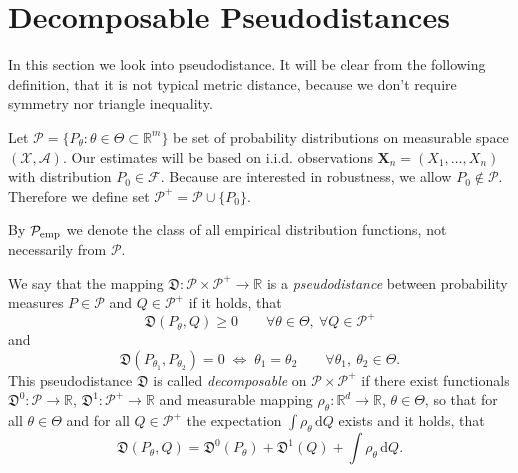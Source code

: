 \section{Decomposable Pseudodistances}

In this section we look into \ren pseudodistance. It will be clear from the following definition, that it is not typical metric distance, because we don't require symmetry nor triangle inequality. 

Let $\mathcal{P} = \lbrace P_\theta : \theta \in \Theta \subset \mathbb{R}^m \rbrace$ be set of probability distributions on measurable space $(\mathcal{X, A})$. Our estimates will be based on i.i.d. observations $\mathbf{X}_n = (X_1, \ldots ,X_n)$ with distribution $P_{0} \in \mathcal{F}$. Because are interested in robustness, we allow $P_{0} \not\in \mathcal{P}$. Therefore we define set $\mathcal{P}^+ = \mathcal{P} \cup \lbrace P_0 \rbrace$.

By $\mathcal{P}_\mathrm{emp}$ we denote the class of all empirical distribution functions, not necessarily from $\mathcal{P}.$
		
		\begin{definition}
	We say that the mapping $\mathfrak{D}:\mathcal{P}\times\mathcal{P}^+ \rightarrow \mathbb{R}$ is a \emph{pseudodistance} between probability measures $P \in \mathcal{P}$ and $Q \in \mathcal{P}^+$ if it holds, that	
		\begin{equation}
			\mathfrak{D}(P_\theta,Q) \geq 0 \qquad \forall \theta \in \Theta, \: \forall Q \in \mathcal{P}^+
		\end{equation}
		and 		
		\begin{equation}
			\mathfrak{D}(P_{\theta_1},P_{\theta_2})=0 \; \Leftrightarrow \; \theta_1=\theta_2 \qquad \forall \theta_1,\: \theta_2 \in \Theta.
		\end{equation}	
	This pseudodistance $\mathfrak{D}$ is called \emph{decomposable} on $\mathcal{P}\times\mathcal{P}^+$ if there exist functionals 
		 $\mathfrak{D}^0:\mathcal{P}\rightarrow\mathbb{R}$, $ \mathfrak{D}^1:\mathcal{P}^+ \rightarrow \mathbb{R}$ and measurable mapping
		  $\rho_\theta : \mathbb{R}^d \rightarrow \mathbb{R}$, $ \theta \in \Theta$, so that for all $\theta \in \Theta$ and for all $Q \in \mathcal{P}^+$ the expectation $\int{\rho_\theta }\, \mathrm{d}Q$ exists and it holds, that
		\begin{equation}
			\mathfrak{D} (P_\theta, Q) = \mathfrak{D}^0 (P_\theta) + \mathfrak{D}^1 (Q) + \int \rho_\theta \, \mathrm{d}Q.
		\end{equation}
\end{definition}

